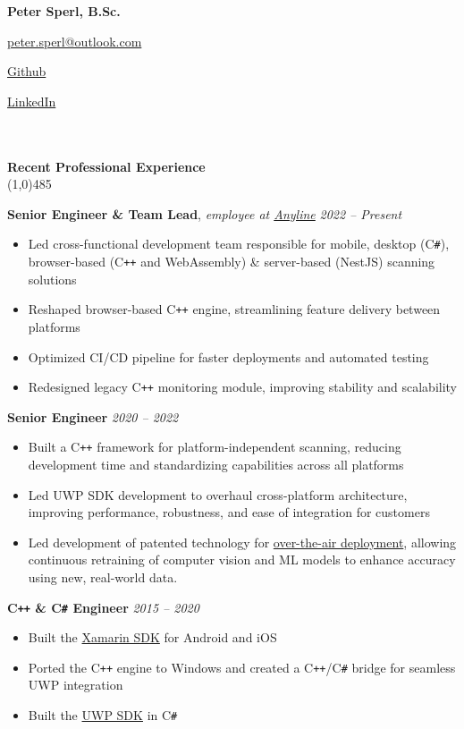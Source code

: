 \documentclass[9pt]{extarticle}
\newcommand\negativespace[1][-0.12cm]{\hspace*{#1}}
\begin{document}
\centerline{{\LARGE \bf Peter Sperl, B.Sc.}}
\centerline{\href{mailto:peter.sperl@outlook.com}{peter.sperl@outlook.com}}
\centerline{\href{https://github.com/leorean}{Github}}
\centerline{\href{https://www.linkedin.com/in/peter-sperl}{LinkedIn}}


\noindent %
\\\\
\vspace*{-6pt}
{\negativespace \Large \bf Recent Professional Experience}\\
\line(1,0){485}
\\
\noindent

\noindent
{\bf Senior Engineer \& Team Lead}, \textit{employee at \href{https://anyline.com}{Anyline}} \hfill \textit{2022 -- Present}
\begin{itemize}
\setlength\itemsep{0.05em}
\item Led cross-functional development team responsible for mobile, desktop (C\texttt{\#}), browser-based (C\texttt{++} and WebAssembly) \& server-based (NestJS) scanning solutions
\item Reshaped browser-based C\texttt{++} engine, streamlining feature delivery between platforms
\item Optimized CI/CD pipeline for faster deployments and automated testing
\item Redesigned legacy C\texttt{++} monitoring module, improving stability and scalability
\end{itemize}


\noindent
{\bf Senior Engineer}  \hfill \textit{2020 -- 2022} 
\begin{itemize}
\setlength\itemsep{0.05em} 
\item Built a C\texttt{++} framework for platform-independent scanning, reducing development time and standardizing capabilities across all platforms
\item Led UWP SDK development to overhaul cross-platform architecture, improving performance, robustness, and ease of integration for customers
\item Led development of patented technology for \href{https://anyline.com/news/rapid-ai-with-closed-loop-training}{over-the-air deployment}, allowing continuous retraining of computer vision and ML models to enhance accuracy using new, real-world data.
\end{itemize}

\noindent
{\bf C\texttt{++} \& C\texttt{\#} Engineer} \hfill \textit{2015 -- 2020}
\begin{itemize}
\setlength\itemsep{0.05em}
\item Built the \href{https://github.com/Anyline/anyline-ocr-xamarin-module}{Xamarin SDK} for Android and iOS
\item Ported the C\texttt{++} engine to Windows and created a C\texttt{++}/C\texttt{\#} bridge for seamless UWP integration
\item Built the \href{https://github.com/Anyline/anyline-ocr-examples-windows-uwp}{UWP SDK} in C\texttt{\#}
\end{itemize}
\end{document}

